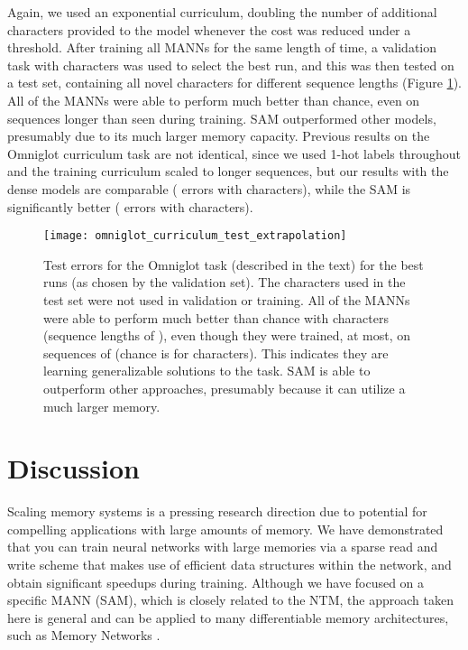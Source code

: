 \documentclass{article}
\begin{document}
Again, we used an exponential curriculum, doubling the number of additional characters provided to the model whenever the cost was reduced under a threshold. After training all MANNs for the same length of time, a validation task with  characters was used to select the best run, and this was then tested on a test set, containing all novel characters for different sequence lengths (Figure \ref{fig:omniglot}). All of the MANNs were able to perform much better than chance, even on sequences  longer than seen during training. SAM outperformed other models, presumably due to its much larger memory capacity. Previous results on the Omniglot curriculum \cite{santoro2016} task are not identical, since we used 1-hot labels throughout and the training curriculum scaled to longer sequences, but our results with the dense models are comparable ( errors with  characters), while the SAM is significantly better ( errors with  characters).



\begin{figure}[h]
\texttt{[image: omniglot\_curriculum\_test\_extrapolation]}
  \caption{Test errors for the Omniglot task (described in the text) for the best runs (as chosen by the validation set). The characters used in the test set were not used in validation or training. All of the MANNs were able to perform much better than chance with  characters (sequence lengths of ), even though they were trained, at most, on sequences of  (chance is  for  characters). This indicates they are learning generalizable solutions to the task. SAM is able to outperform other approaches, presumably because it can utilize a much larger memory. }
\label{fig:omniglot}
\end{figure}















\section{Discussion}

Scaling memory systems is a pressing research direction due to potential for compelling applications with large amounts of memory. We have demonstrated that you can train neural networks with large memories via a sparse read and write scheme that makes use of efficient data structures within the network, and obtain significant speedups during training. Although we have focused on a specific MANN (SAM), which is closely related to the NTM, the approach taken here is general and can be applied to many differentiable memory architectures, such as Memory Networks \cite{weston2014memory}.
\end{document}

